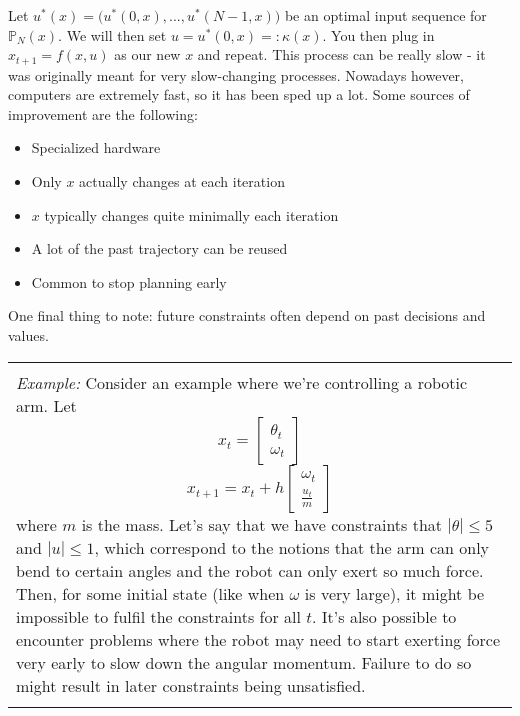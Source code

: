 \documentclass{article}
\newenvironment{parboxed}
    {\begin{center}
    \begin{tabular}{|p{0.9\textwidth}|}
    \hline\\
    }
    { 
    \\\\\hline
    \end{tabular} 
    \end{center}
    }
\newcommand{\mat}[1]{\begin{bmatrix} #1 \end{bmatrix}}
\begin{document}
Let $u^*(x) = \Big(u^*(0,x), ..., u^*(N-1,x)\Big)$ be an optimal input sequence for $\mathbb{P}_N(x)$. We will then set $u = u^*(0,x)=:\kappa(x)$.
You then plug in $x_{t+1} = f(x, u)$ as our new $x$ and repeat. 
This process can be really slow - it was originally meant for very slow-changing processes. 
Nowadays however, computers are extremely fast, so it has been sped up a lot.
Some sources of improvement are the following:

\begin{itemize}
    \item Specialized hardware 
    \item Only $x$ actually changes at each iteration
    \item $x$ typically changes quite minimally each iteration
    \item A lot of the past trajectory can be reused
    \item Common to stop planning early
\end{itemize}

One final thing to note: future constraints often depend on past decisions and values.

\begin{parboxed}
\emph{Example: } Consider an example where we're controlling a robotic arm. Let
$$x_t = \mat{\theta_t \\ \omega_t}$$
$$x_{t+1} = x_t + h\mat{\omega_t \\ \frac{u_t}{m}}$$
where $m$ is the mass. Let's say that we have constraints that $|\theta|\leq 5$ and $|u|\leq 1$, which correspond to the notions that the arm can only bend to certain angles and the robot can only exert so much force.
Then, for some initial state (like when $\omega$ is very large), it might be impossible to fulfil the constraints for all $t$.
It's also possible to encounter problems where the robot may need to start exerting force very early to slow down the angular momentum.
Failure to do so might result in later constraints being unsatisfied.
\end{parboxed}
\end{document}

